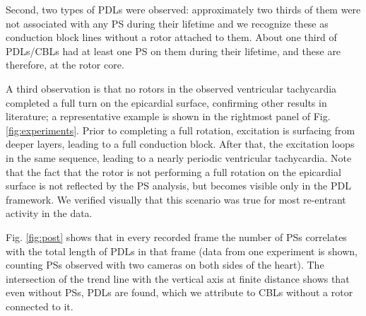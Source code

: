 \documentclass{article}
\begin{document}
Second, two types of PDLs were observed: approximately two thirds of them were not associated with any PS during their lifetime and we recognize these as conduction block lines without a rotor attached to them. About one third of PDLs/CBLs had at least one PS on them during their lifetime, and these are therefore, at the rotor core. 

A third observation is that no rotors in the observed ventricular tachycardia completed a full turn on the epicardial surface, confirming other results in literature; a representative example is shown in the rightmost panel of Fig. \ref{fig:experiments}. Prior to completing a full rotation, excitation is surfacing from deeper layers, leading to a full conduction block. After that, the excitation loops in the same sequence, leading to a nearly periodic ventricular tachycardia. Note that the fact that the rotor is not performing a full rotation on the epicardial surface is not reflected by the PS analysis, but becomes visible only in the PDL framework. We verified visually that this scenario was true for most re-entrant activity in the data. %

Fig. \ref{fig:post} shows that in every recorded frame the number of PSs correlates with the total length of PDLs in that frame (data from one experiment is shown, counting PSs observed with two cameras on both sides of the heart). The intersection of the trend line with the vertical axis at finite distance shows that even without PSs, PDLs are found, which we attribute to CBLs without a rotor connected to it. %
\end{document}
